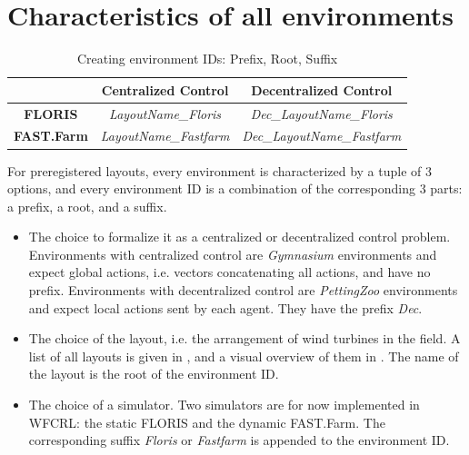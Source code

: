 \documentclass{article}
\newcommand{\md}[1]{{\color{red}#1}}
\begin{document}
\section{Characteristics of all environments} \label{appendix:envs}
\begin{table}[!htb]
    \centering
    \begin{tabular}{c|c|c}
    \hline
         & \textbf{Centralized Control} & \textbf{Decentralized Control} \\
         \hline
       \textbf{FLORIS}  & \textit{LayoutName\_Floris} & \textit{Dec\_LayoutName\_Floris}\\
       \textbf{FAST.Farm} & \textit{LayoutName\_Fastfarm} & \textit{Dec\_LayoutName\_Fastfarm}\\
       \hline
    \end{tabular}
    \caption{Creating environment IDs: Prefix, Root, Suffix}
    \label{tab:env_id}
\end{table}
For preregistered layouts, every environment is characterized by a tuple of $3$ options, and every environment ID is a combination of the corresponding $3$ parts: a prefix, a root, and a suffix.
\begin{itemize}
    \item The choice to formalize it as a centralized or decentralized control problem. Environments with centralized control are \textit{Gymnasium} environments and expect global actions, i.e. vectors concatenating all actions, and have no prefix. Environments with decentralized control are \textit{PettingZoo} environments and expect local actions sent by each agent. They have the prefix \textit{Dec}.
    \item The choice of the layout, i.e. the arrangement of wind turbines in the field. A list of all layouts is given in , and a visual overview of them in . The name of the layout is the root of the environment ID.
    \item The choice of a simulator. Two simulators are for now implemented in WFCRL: the static FLORIS and the dynamic FAST.Farm. The corresponding suffix \textit{Floris} or \textit{Fastfarm} is appended to the environment ID.
\end{itemize}
\end{document}

